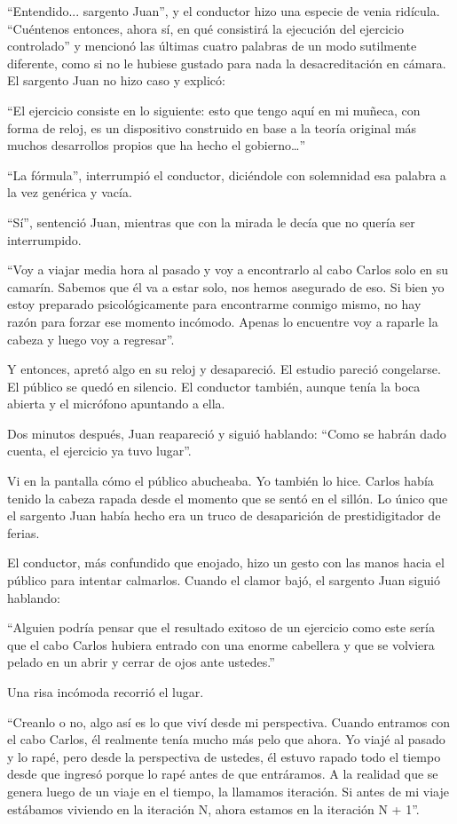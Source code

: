 \documentclass[12pt,twoside,openright]{book}
\begin{document}
“Entendido... sargento Juan”, y el conductor hizo una especie de venia ridícula. “Cuéntenos entonces, ahora sí, en qué consistirá la ejecución del ejercicio controlado” y mencionó las últimas cuatro palabras de un modo sutilmente diferente, como si no le hubiese gustado para nada la desacreditación en cámara. El sargento Juan no hizo caso y explicó:

“El ejercicio consiste en lo siguiente: esto que tengo aquí en mi muñeca, con forma de reloj, es un dispositivo construido en base a la teoría original más muchos desarrollos propios que ha hecho el gobierno…”

“La fórmula”, interrumpió el conductor, diciéndole con solemnidad esa palabra a la vez genérica y vacía.

“Sí”, sentenció Juan, mientras que con la mirada le decía que no quería ser interrumpido.

“Voy a viajar media hora al pasado y voy a encontrarlo al cabo Carlos solo en su camarín. Sabemos que él va a estar solo, nos hemos asegurado de eso. Si bien yo estoy preparado psicológicamente para encontrarme conmigo mismo, no hay razón para forzar ese momento incómodo. Apenas lo encuentre voy a raparle la cabeza y luego voy a regresar”.

Y entonces, apretó algo en su reloj y desapareció. El estudio pareció congelarse. El público se quedó en silencio. El conductor también, aunque tenía la boca abierta y el micrófono apuntando a ella.

Dos minutos después, Juan reapareció y siguió hablando: “Como se habrán dado cuenta, el ejercicio ya tuvo lugar”.

Vi en la pantalla cómo el público abucheaba. Yo también lo hice. Carlos había tenido la cabeza rapada desde el momento que se sentó en el sillón. Lo único que el sargento Juan había hecho era un truco de desaparición de prestidigitador de ferias.

El conductor, más confundido que enojado, hizo un gesto con las manos hacia el público para intentar calmarlos. Cuando el clamor bajó, el sargento Juan siguió hablando:

“Alguien podría pensar que el resultado exitoso de un ejercicio como este sería que el cabo Carlos hubiera entrado con una enorme cabellera y que se volviera pelado en un abrir y cerrar de ojos ante ustedes.”

Una risa incómoda recorrió el lugar.

“Creanlo o no, algo así es lo que viví desde mi perspectiva. Cuando entramos con el cabo Carlos, él realmente tenía mucho más pelo que ahora. Yo viajé al pasado y lo rapé, pero desde la perspectiva de ustedes, él estuvo rapado todo el tiempo desde que ingresó porque lo rapé antes de que entráramos. A la realidad que se genera luego de un viaje en el tiempo, la llamamos iteración. Si antes de mi viaje estábamos viviendo en la iteración N, ahora estamos en la iteración N + 1”.
\end{document}
